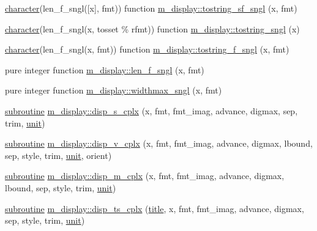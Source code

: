 \begin{DoxyCompactItemize}
\hyperlink{option__stopwatch_83_8txt_abd4b21fbbd175834027b5224bfe97e66}{character}(len\+\_\+f\+\_\+sngl(\mbox{[}x\mbox{]}, fmt)) function \hyperlink{namespacem__display_a7767d9921f1509c55b3cae0cb7ba69b4}{m\+\_\+display\+::tostring\+\_\+sf\+\_\+sngl} (x, fmt)
\item 
\hyperlink{option__stopwatch_83_8txt_abd4b21fbbd175834027b5224bfe97e66}{character}(len\+\_\+f\+\_\+sngl(x, tosset \% rfmt)) function \hyperlink{namespacem__display_a369e3db088c0732554bd00dac6ce628d}{m\+\_\+display\+::tostring\+\_\+sngl} (x)
\item 
\hyperlink{option__stopwatch_83_8txt_abd4b21fbbd175834027b5224bfe97e66}{character}(len\+\_\+f\+\_\+sngl(x, fmt)) function \hyperlink{namespacem__display_a3c751ef3422139ca7190d5b0d64638a8}{m\+\_\+display\+::tostring\+\_\+f\+\_\+sngl} (x, fmt)
\item 
pure integer function \hyperlink{namespacem__display_ae0feb946fbc4c31f8ba53e20719fa508}{m\+\_\+display\+::len\+\_\+f\+\_\+sngl} (x, fmt)
\item 
pure integer function \hyperlink{namespacem__display_a3bb36db16c84ea38d1697191adbc027a}{m\+\_\+display\+::widthmax\+\_\+sngl} (x, fmt)
\item 
\hyperlink{M__stopwatch_83_8txt_acfbcff50169d691ff02d4a123ed70482}{subroutine} \hyperlink{namespacem__display_a2d8cd9c698ef035111fdc53524abe523}{m\+\_\+display\+::disp\+\_\+s\+\_\+cplx} (x, fmt, fmt\+\_\+imag, advance, digmax, sep, trim, \hyperlink{M__stopwatch_83_8txt_a5cbef30eb7c0d734bd82f5a7ebea9aa7}{unit})
\item 
\hyperlink{M__stopwatch_83_8txt_acfbcff50169d691ff02d4a123ed70482}{subroutine} \hyperlink{namespacem__display_a37cf49f7db41c24a8f363474283909d6}{m\+\_\+display\+::disp\+\_\+v\+\_\+cplx} (x, fmt, fmt\+\_\+imag, advance, digmax, lbound, sep, style, trim, \hyperlink{M__stopwatch_83_8txt_a5cbef30eb7c0d734bd82f5a7ebea9aa7}{unit}, orient)
\item 
\hyperlink{M__stopwatch_83_8txt_acfbcff50169d691ff02d4a123ed70482}{subroutine} \hyperlink{namespacem__display_a86ed603fd65468b46aad9ff127dc517c}{m\+\_\+display\+::disp\+\_\+m\+\_\+cplx} (x, fmt, fmt\+\_\+imag, advance, digmax, lbound, sep, style, trim, \hyperlink{M__stopwatch_83_8txt_a5cbef30eb7c0d734bd82f5a7ebea9aa7}{unit})
\item 
\hyperlink{M__stopwatch_83_8txt_acfbcff50169d691ff02d4a123ed70482}{subroutine} \hyperlink{namespacem__display_a008a43400dfc972afef14c2c6d1ddbf3}{m\+\_\+display\+::disp\+\_\+ts\+\_\+cplx} (\hyperlink{print__watch_83_8txt_a15b5bd21156bb9fca6a755ab8c029a9c}{title}, x, fmt, fmt\+\_\+imag, advance, digmax, sep, style, trim, \hyperlink{M__stopwatch_83_8txt_a5cbef30eb7c0d734bd82f5a7ebea9aa7}{unit})

\end{DoxyCompactItemize}
